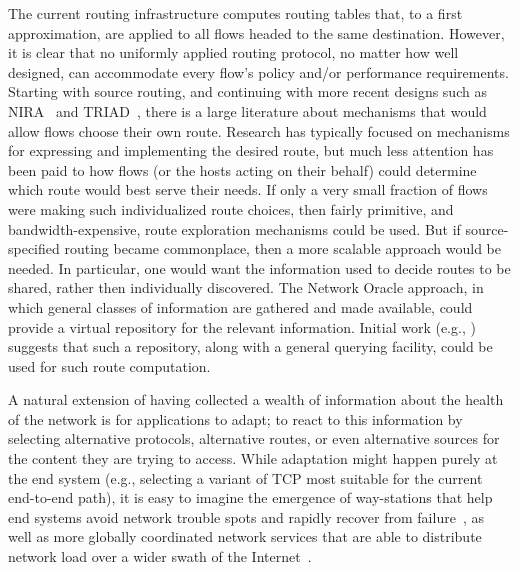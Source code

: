 \documentclass[twocolumn,10pt]{article}
\newcommand{\note}[1]{}
\def\Sys{Network Oracle\xspace}
\begin{document}
\vspace{1em}
\note{Shenker}
The current routing infrastructure computes routing tables that, to a
first approximation, are applied to all flows headed to the same
destination.  However, it is clear that no uniformly applied routing
protocol, no matter how well designed, can accommodate every flow's
policy and/or performance requirements.  Starting with source routing,
and continuing with more recent designs such as NIRA~\cite{nira} and
TRIAD~\cite{gritterarchitecture}, there is a 
large literature about mechanisms that would allow flows choose their
own route.  Research has typically focused on mechanisms for
expressing and implementing the desired route, but much less attention
has been paid to how flows (or the hosts acting on their behalf) could
determine which route would best serve their needs.  If only a very
small fraction of flows were making such individualized route choices,
then fairly primitive, and bandwidth-expensive, route exploration
mechanisms could be used.  But if source-specified routing became
commonplace, then a more scalable approach would be needed.  In
particular, one would want the information used to decide routes to be shared,
rather then individually discovered.  The \Sys approach, in which
general classes of information are gathered and made available, could
provide a virtual repository for the relevant information.  Initial work (e.g.,
\cite{karthik-routeservice,boon-recursion-tr}) suggests
that such a repository, along with a general querying facility, could
be used for such route computation.

\vspace{1em} 
\note{Peterson} A natural extension of having collected a wealth
of information about the health of the network is for applications to
adapt; to react to this information by selecting alternative protocols,
alternative routes, or even alternative sources for the content they
are trying to access. While adaptation might happen purely at the end
system (e.g., selecting a variant of TCP most suitable for the current
end-to-end path), it is easy to imagine the emergence of
way-stations that help end systems avoid network trouble spots and
rapidly recover from failure~\cite{i3:sigcomm02,ron:sosp01}, as well as more
globally coordinated network services that are able to distribute
network load over a wider swath of the Internet~\cite{codeen,coral}.
\end{document}
